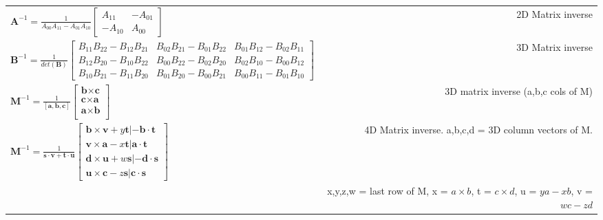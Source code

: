 \documentclass{article}
\begin{document}
{\begin{tabulary}{8in}{LR}
$\textbf{A}^{-1} = \frac{1}{A_{00}A_{11} - A_{01}A_{10}} 
\begin{bmatrix}
A_{11} & -A_{01} \\
-A_{10} & A_{00}
\end{bmatrix}$ & 2D Matrix inverse \\

$\textbf{B}^{-1} = \frac{1}{det(\textbf{B})} 
\begin{bmatrix}
B_{11}B_{22} - B_{12}B_{21} & B_{02}B_{21} - B_{01}B_{22} & B_{01}B_{12} - B_{02}B_{11} \\
B_{12}B_{20} - B_{10}B_{22} & B_{00}B_{22} - B_{02}B_{20} & B_{02}B_{10} - B_{00}B_{12} \\
B_{10}B_{21} - B_{11}B_{20} & B_{01}B_{20} - B_{00}B_{21} & B_{00}B_{11} - B_{01}B_{10}
\end{bmatrix} $ & 3D Matrix inverse \\

$ \textbf{M}^{-1} = \frac{1}{[\textbf{a},\textbf{b},\textbf{c}]} 
\begin{bmatrix}
\textbf{b} \times \textbf{c} \\
\textbf{c} \times \textbf{a} \\
\textbf{a} \times \textbf{b} \\
\end{bmatrix}
$ & 3D matrix inverse (a,b,c cols of M) \\

$\textbf{M}^{-1} = \frac{1}{\textbf{s} \cdot \textbf{v} + \textbf{t} \cdot \textbf{u}}
\begin{bmatrix}
\textbf{b} \times \textbf{v} + y\textbf{t} | -\textbf{b} \cdot \textbf{t} \\
\textbf{v} \times \textbf{a} - x\textbf{t} | \textbf{a} \cdot \textbf{t} \\
\textbf{d} \times \textbf{u} + w\textbf{s} | -\textbf{d} \cdot \textbf{s} \\
\textbf{u} \times \textbf{c} - z\textbf{s} | \textbf{c} \cdot \textbf{s}
\end{bmatrix}
$ & 4D Matrix inverse. a,b,c,d = 3D column vectors of M. \\

& x,y,z,w = last row of M, x = $a \times b$, t = $c \times d$,
u = $ya -xb$, v = $wc -zd$ \\

\end{tabulary} %
}





\end{document}
